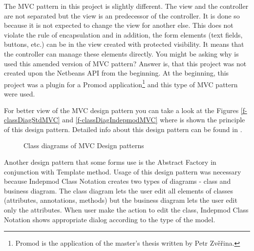 The MVC pattern in this project is slightly different. The view and the controller are not separated but the view is an predecessor of the controller. It is done so because it is not expected to change the view for another else. This does not violate the rule of encapsulation and in addition, the form elements (text fields, buttons, etc.) can be in the view created with protected visibility. It means that the controller can manage these elements directly. You might be asking why is used this amended version of MVC pattern? Answer is, that this project was not created upon the Netbeans API from the beginning. At the beginning, this project was a plugin for a Promod application\footnote{Promod is the application of the master's thesis written by Petr Zv\v{e}\v{r}ina.} and this type of MVC pattern were used.

For better view of the MVC design pattern you can take a look at the Figures \ref{f-classDiagStdMVC} and \ref{f-classDiagIndepmodMVC} where is shown the principle of this design pattern. Detailed info about this design pattern can be found in \cite{DesignPatterns}.

\begin{figure}[!ht]
\begin{center}
\caption{Class diagrams of MVC Design patterns}
\label{f-classDiagMVC}
\end{center}
\end{figure}

Another design pattern that some forms use is the Abstract Factory in conjunction with Template method. Usage of this design pattern was necessary because Indepmod Class Notation creates two types of diagrams - class and business diagram. The class diagram lets the user edit all elements of classes (attributes, annotations, methods) but the business diagram lets the user edit only the attributes. When user make the action to edit the class, Indepmod Class Notation shows appropriate dialog according to the type of the model.

